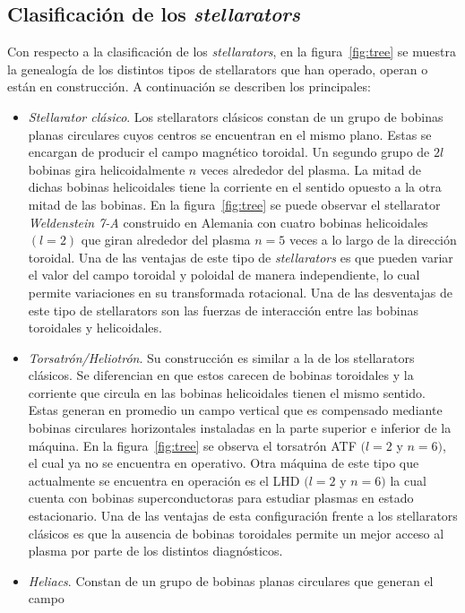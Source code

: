\subsection{Clasificación de los \textit{stellarators}}
Con respecto a la clasificación de los \textit{stellarators}, en la figura~\ref{fig:tree} se muestra la genealogía
de los distintos tipos de stellarators que han operado, operan o están en construcción. A
continuación se describen los principales:
\begin{itemize}
    \item \textit{Stellarator clásico}. Los stellarators clásicos constan de un grupo de bobinas planas circulares
    cuyos centros se encuentran en el mismo plano. Estas se encargan de producir
    el campo magnético toroidal. Un segundo grupo de $2l$ bobinas gira helicoidalmente $n$
    veces alrededor del plasma. La mitad de dichas bobinas helicoidales tiene la corriente
    en el sentido opuesto a la otra mitad de las bobinas. En la figura~\ref{fig:tree} se puede observar
    el stellarator \textit{Weldenstein 7-A} construido en Alemania con cuatro bobinas helicoidales
    $(l=2)$ que giran alrededor del plasma $n=5$ veces a lo largo de la dirección toroidal.
    Una de las ventajas de este tipo de \textit{stellarators} es que pueden variar el valor del campo
    toroidal y poloidal de manera independiente, lo cual permite variaciones en su transformada
    rotacional.
    Una de las desventajas de este tipo de stellarators son las fuerzas de interacción entre
    las bobinas toroidales y helicoidales.
    \item \textit{Torsatrón/Heliotrón}. Su construcción es similar a la de los stellarators clásicos. Se
    diferencian en que estos carecen de bobinas toroidales y la corriente que circula en
    las bobinas helicoidales tienen el mismo sentido. Estas generan en promedio un campo
    vertical que es compensado mediante bobinas circulares horizontales instaladas en la
    parte superior e inferior de la máquina. En la figura~\ref{fig:tree} se observa el torsatrón ATF
   $(l=2$ y $n=6)$, el cual ya no se encuentra en operativo. Otra máquina de este tipo
    que actualmente se encuentra en operación es el LHD $(l=2$ y $n=6)$ la cual cuenta con
    bobinas superconductoras para estudiar plasmas en estado estacionario.
    Una de las ventajas de esta configuración frente a los stellarators clásicos es que la
    ausencia de bobinas toroidales permite un mejor acceso al plasma por parte de los
    distintos diagnósticos.
    \item \textit{Heliacs}. Constan de un grupo de bobinas planas circulares que generan el campo

\end{itemize}
